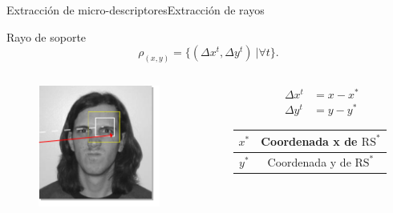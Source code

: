 \documentclass{beamer}
\begin{document}
        
		\begin{frame}{Extracción de micro-descriptores}{Extracción de rayos}
			\begin{block}{Rayo de soporte}
				\begin{equation}
					\rho_{(x,y)} = \{(\Delta x^{t}, \Delta y^{t})~| \forall t\}.
				\end{equation}		 
            \end{block}			
			
			\begin{columns}[onlytextwidth]
                \begin{column}{0.5\textwidth}
					\begin{figure}[bt]
        					\centering
                			\includegraphics[width=4cm]{imagenes/MSE2.png}
            			\end{figure}      	        	
	        		\end{column}
                \begin{column}{0.5\textwidth}
                		\begin{align}
						\Delta x^{t} &= x-x^*\\ 
						\Delta y^{t} &= y-y^*
					\end{align}
	
					\begin{table}
                			
					\begin{tabular}{|c|c|}
					                \hline 
					                $x^*$ & Coordenada x de $\text{RS}^*$ \\ 
					                \hline 
					                $y^*$ & Coordenada y de $\text{RS}^*$ \\ 
					                \hline 
					 \end{tabular} 
                		\end{table}					
					
	        		\end{column}
	        \end{columns}			
			

            
				            
            
		\end{frame}		        
        
\end{document}
